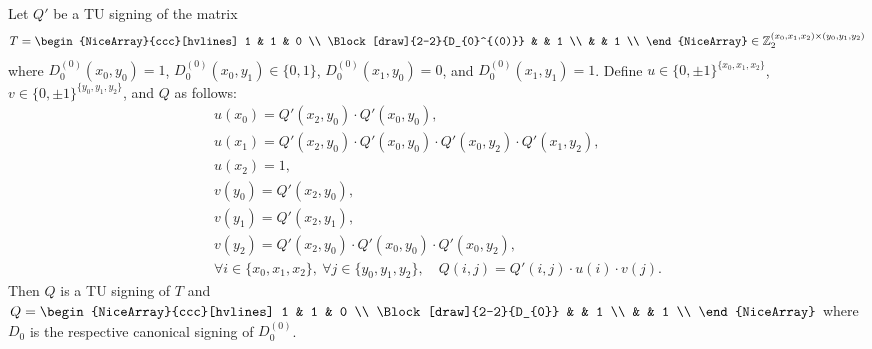\begin{lemma}\label{lem:three_sum_canonical_resigning_helper}
    Let $Q'$ be a TU signing of the matrix
    \[
        T = \begin{NiceArray}{ccc}[hvlines]
            1 & 1 & 0 \\
            \Block[draw]{2-2}{D_{0}^{(0)}} & & 1 \\
             & & 1 \\
        \end{NiceArray} \in \mathbb{Z}_{2}^{(x_{0}, x_{1}, x_{2}) \times (y_{0}, y_{1}, y_{2})}
    \]
    where $D_{0}^{(0)} (x_{0}, y_{0}) = 1$, $D_{0}^{(0)} (x_{0}, y_{1}) \in \{0, 1\}$, $D_{0}^{(0)} (x_{1}, y_{0}) = 0$, and $D_{0}^{(0)} (x_{1}, y_{1}) = 1$. Define $u \in \{0, \pm 1\}^{\{x_{0}, x_{1}, x_{2}\}}$, $v \in \{0, \pm 1\}^{\{y_{0}, y_{1}, y_{2}\}}$, and $Q$ as follows:
    \begin{gather*}
        u(x_{0}) = Q' (x_{2}, y_{0}) \cdot Q' (x_{0}, y_{0}), \\
        u(x_{1}) = Q' (x_{2}, y_{0}) \cdot Q' (x_{0}, y_{0}) \cdot Q' (x_{0}, y_{2}) \cdot Q' (x_{1}, y_{2}), \\
        u(x_{2}) = 1, \\
        v(y_{0}) = Q' (x_{2}, y_{0}), \\
        v(y_{1}) = Q' (x_{2}, y_{1}), \\
        v(y_{2}) = Q' (x_{2}, y_{0}) \cdot Q' (x_{0}, y_{0}) \cdot Q' (x_{0}, y_{2}), \\
        \forall i \in \{x_{0}, x_{1}, x_{2}\}, \ \forall j \in \{y_{0}, y_{1}, y_{2}\}, \quad Q (i, j) = Q' (i, j) \cdot u(i) \cdot v(j).
    \end{gather*}
    Then $Q$ is a TU signing of $T$ and $Q = \begin{NiceArray}{ccc}[hvlines] 1 & 1 & 0 \\ \Block[draw]{2-2}{D_{0}} & & 1 \\ & & 1 \\ \end{NiceArray}$ where $D_{0}$ is the respective canonical signing of $D_{0}^{(0)}$.
\end{lemma}

